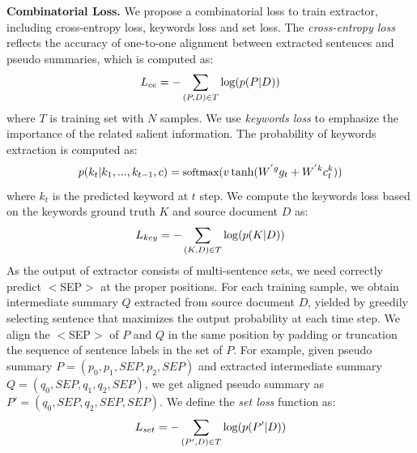 \textbf{Combinatorial Loss.} 
We propose a combinatorial loss to train extractor, including
cross-entropy loss, keywords loss and set loss.
The {\em cross-entropy loss} reflects the accuracy of one-to-one alignment between
extracted sentences and pseudo summaries, which is computed as:
\begin{equation}
\small
L_{ce} = - \sum_{(P,D) \in T}{\log(p(P|D))}
\end{equation}
where $T$ is training set with $N$ samples.
We use {\em keywords loss} to emphasize the importance of the related salient information.
The probability of keywords extraction is computed as: 
\begin{equation}
\small
p(k_t|k_1,...,k_{t-1},c) = \textup{softmax}(v \tanh(W^{'g} g_{t} + W^{'k} c_t^k)) 
\end{equation}
where $k_t$ is the predicted keyword at $t$ step.
We compute the keywords loss based on the keywords ground truth $K$ 
and source document $D$ as:
\begin{equation}
\small
L_{key} = - \sum_{(K,D) \in T}{\log(p(K|D))}
\end{equation}
As the output of extractor consists of multi-sentence sets,
we need correctly predict $<$SEP$>$ at the proper positions.
For each training sample, we obtain intermediate summary $Q$ 
extracted from source document $D$, 
yielded by greedily selecting sentence that maximizes the output
probability at each time step.
We align the $<$SEP$>$ of $P$ and $Q$
in the same position by padding or truncation 
the sequence of sentence labels in the set of $P$.
For example, given pseudo summary $P = (p_0,p_1,SEP,p_2,SEP)$ 
and extracted intermediate summary $Q = (q_0,SEP,q_1,q_2,SEP)$, we get aligned pseudo 
summary as 
$P' = (q_0,SEP,q_2,SEP,SEP)$.
We define the {\em set loss} function as:
\begin{equation}
\small
L_{set} = -  \sum_{(P',D) \in T}{\log(p(P'|D))}
\end{equation}


